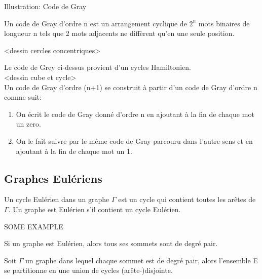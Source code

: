 Illustration: Code de Gray

Un code de Gray d'ordre n est un arrangement cyclique de $2^{n}$ mots binaires de longueur n tels que 2 mots adjacents ne diffèrent qu'en une seule position.\\

\begin{exmp}
<dessin cercles concentriques>
\end{exmp}

Le code de Grey ci-dessus provient d'un cycles Hamiltonien.\\

<dessin cube et cycle>\\

Un code de Gray d'ordre (n+1) se construit à partir d'un code de Gray d'ordre n comme suit:

\begin{enumerate}
\item On écrit le code de Gray donné d'ordre n en ajoutant à la fin de chaque mot un zero.
\item On le fait suivre par le même code de Gray parcouru dans l'autre sens et en ajoutant à la fin de chaque mot un 1.
\end{enumerate}


\subsection{Graphes Eulériens}

\begin{defn}
Un cycle Eulérien dans un graphe $\Gamma$ est un cycle qui contient toutes les arêtes de $\Gamma$.
Un graphe est Eulérien s'il contient un cycle Eulérien.\\
\end{defn}

\begin{exmp}
SOME EXAMPLE\\
\end{exmp}

\begin{prop}
Si un graphe est Eulérien, alors tous ses sommets sont de degré pair.\\
\end{prop}

\begin{lemme}
Soit $\Gamma$ un graphe dans lequel chaque sommet est de degré pair, alors l'ensemble E se partitionne en une union de cycles (arête-)disjointe.\\
\end{lemme}

